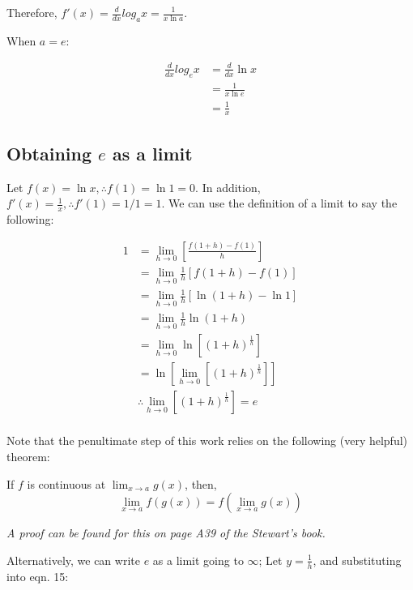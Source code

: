 \documentclass[12pt]{article}
\begin{document}
Therefore, $f'(x) = \frac{d}{dx} log_a{x} = \frac{1}{x \ln a}$.

When $a = e$:

\begin{equation}
    \begin{split}
        \frac{d}{dx} log_e{x} &= \frac{d}{dx} \ln x\\
        &= \frac{1}{x \ln e} \\
        &= \frac{1}{x}
    \end{split}
\end{equation}

\subsection{Obtaining \texorpdfstring{$e$}{TEXT} as a limit}

Let $f(x) = \ln x, \therefore f(1) = \ln 1 = 0$. In addition, $f'(x) = \frac{1}{x}, \therefore f'(1) = 1/1 = 1$. We can use the definition of a limit to say the following:

\begin{equation}
    \begin{split}
        1 &= \lim_{h \to 0}[\frac{f(1+h) - f(1)}{h}]\\
        &= \lim_{h\to 0}\frac{1}{h}[f(1+h)-f(1)]\\
        &= \lim_{h\to 0} \frac{1}{h}[\ln (1+h) - \ln 1]\\
        &= \lim_{h\to 0} \frac{1}{h} \ln(1+h)\\
        &= \lim_{h\to 0} \ln[(1+h)^{\frac{1}{h}}]\\
        &= \ln[\lim_{h\to 0}[(1+h)^{\frac{1}{h}}]]\\
        &\therefore \lim_{h\to 0}[(1+h)^{\frac{1}{h}}] = e\\
    \end{split}
\end{equation}

Note that the penultimate step of this work relies on the following (very helpful) theorem:

\begin{shaded}
    If $f$ is continuous at $\lim_{x\to a} g(x)$, then,
    $$\lim_{x\to a} f(g(x)) = f(\lim_{x\to a} g(x))$$

    \textit{A proof can be found for this on page A39 of the Stewart's book.}
\end{shaded}


Alternatively, we can write $e$ as a limit going to $\infty$; Let $y = \frac{1}{h}$, and substituting into eqn. 15:
\end{document}

